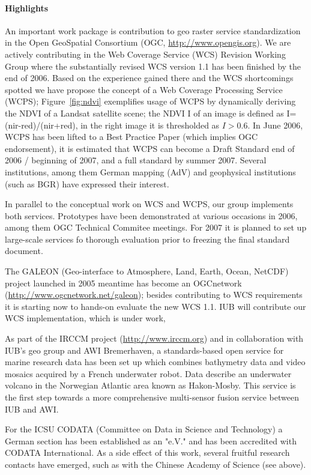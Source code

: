 \paragraph{Highlights}

An important work package is contribution to geo raster service
standardization in the Open GeoSpatial Consortium (OGC,
\url{http://www.opengis.org}). We are actively contributing in the
Web Coverage Service (WCS) Revision Working Group where the
substantially revised WCS version 1.1 has been finished by the end
of 2006. Based on the experience gained there and the WCS
shortcomings spotted we have propose the concept of a Web Coverage
Processing Service (WCPS); Figure~\ref{fig:ndvi} exemplifies usage
of WCPS by dynamically deriving the NDVI of a Landsat satellite
scene; the NDVI I of an image is defined as I=(nir-red)/(nir+red),
in the right image it is thresholded as $I>0.6$. In June 2006, WCPS
has been lifted to a Best Practice Paper (which implies OGC
endorsement), it is estimated that WCPS can become a Draft Standard
end of 2006 / beginning of 2007, and a full standard by summer 2007.
Several institutions, among them German mapping (AdV) and
geophysical institutions (such as BGR) have expressed their
interest.

In parallel to the conceptual work on WCS and WCPS, our group implements both
services. Prototypes have been demonstrated at various occasions in 2006, among them OGC
Technical Commitee meetings. For 2007 it is planned to set up large-scale services fo
thorough evaluation prior to freezing the final standard document.

The GALEON (Geo-interface to Atmosphere, Land, Earth, Ocean, NetCDF) project launched in
2005 meantime has become an OGCnetwork (\url{http://www.ogcnetwork.net/galeon}); besides
contributing to WCS requirements it is starting now to hands-on evaluate the new WCS
1.1. IUB will contribute our WCS implementation, which is under work,

As part of the IRCCM project (\url{http://www.irccm.org}) and in collaboration with IUB's geo group and
AWI Bremerhaven, a standards-based open service for marine research data has been set up
which combines bathymetry data and video mosaics acquired by a French underwater
robot. Data describe an underwater volcano in the Norwegian Atlantic area known as
Hakon-Mosby. This service is the first step towards a more comprehensive multi-sensor
fusion service between IUB and AWI.

For the ICSU CODATA (Committee on Data in Science and Technology) a German section has
been established as an "e.V." and has been accredited with CODATA International. As a side
effect of this work, several fruitful research contacts have emerged, such as with the
Chinese Academy of Science (see above).

